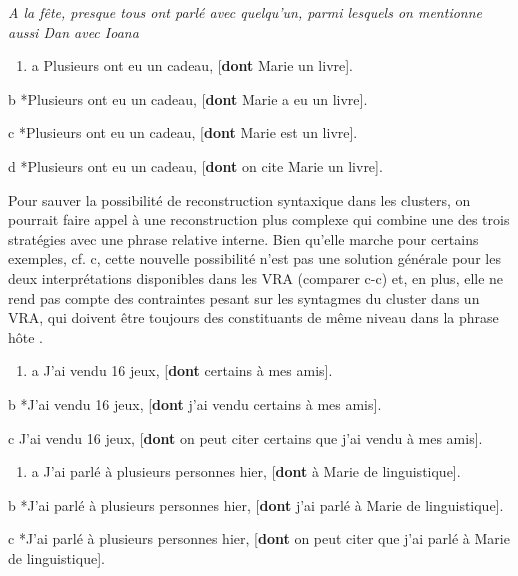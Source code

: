     \textit{A la fête, presque tous ont parlé avec quelqu'un, parmi lesquels on mentionne aussi Dan avec Ioana}


\begin{enumerate}
\item a  Plusieurs ont eu un cadeau, [\textbf{dont} Marie un livre]. 


\end{enumerate}
  b  *Plusieurs ont eu un cadeau, [\textbf{dont} Marie a eu un livre].

  c  *Plusieurs ont eu un cadeau, [\textbf{dont} Marie est un livre].

  d  *Plusieurs ont eu un cadeau, [\textbf{dont} on cite Marie un livre].

Pour sauver la possibilité de reconstruction syntaxique dans les clusters, on pourrait faire appel à une reconstruction plus complexe qui combine une des trois stratégies avec une phrase relative interne. Bien qu'elle marche pour certains exemples, cf. c, cette nouvelle possibilité n'est pas une solution générale pour les deux interprétations disponibles dans les VRA (comparer c-c) et, en plus, elle ne rend pas compte des contraintes pesant sur les syntagmes du cluster dans un VRA, qui doivent être toujours des constituants de même niveau dans la phrase hôte .


\begin{enumerate}
\item \label{bkm:Ref295811496}a  J'ai vendu 16 jeux, [\textbf{dont} certains à mes amis]. 


\end{enumerate}
  b  *J'ai vendu 16 jeux, [\textbf{dont} j'ai vendu\textbf{} certains à mes amis].

  c  J'ai vendu 16 jeux, [\textbf{dont} on peut citer\textbf{} certains\textbf{} que j'ai vendu à mes amis].


\begin{enumerate}
\item \label{bkm:Ref295811498}a  J'ai parlé à plusieurs personnes hier, [\textbf{dont} à Marie de linguistique]. 


\end{enumerate}
  b  *J'ai parlé à plusieurs personnes hier, [\textbf{dont} j'ai parlé à Marie de linguistique].

  c  *J'ai parlé à plusieurs personnes hier, [\textbf{dont} on peut citer que j'ai parlé\textbf{} à Marie de linguistique].



